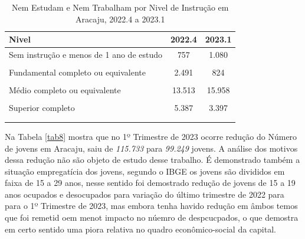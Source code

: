 \documentclass[
  12pt,
  a4paper,
]{article}
\begin{document}
\begingroup\fontsize{9}{11}\selectfont

\begin{longtable}[t]{>{\raggedright\arraybackslash}p{7cm}cc}
\caption{\label{tab:tab7}\label{tab7}Nem Estudam e Nem Trabalham por Nivel de Instrução em Aracaju, 2022.4 a 2023.1}\\
\toprule
Nivel & 2022.4 & 2023.1\\
\midrule
Sem instrução e menos de 1 ano de estudo & 757 & 1.080\\
\cellcolor[HTML]{DCDCDC}{Fundamental incompleto ou equivalente} & \cellcolor[HTML]{DCDCDC}{5.301} & \cellcolor[HTML]{DCDCDC}{8.316}\\
Fundamental completo ou equivalente & 2.491 & 824\\
\cellcolor[HTML]{DCDCDC}{Médio incompleto ou equivalente} & \cellcolor[HTML]{DCDCDC}{4.625} & \cellcolor[HTML]{DCDCDC}{2.937}\\
Médio completo ou equivalente & 13.513 & 15.958\\
\addlinespace
\cellcolor[HTML]{DCDCDC}{Superior incompleto ou equivalente} & \cellcolor[HTML]{DCDCDC}{1.827} & \cellcolor[HTML]{DCDCDC}{1.794}\\
Superior completo & 5.387 & 3.397\\
\bottomrule
\multicolumn{3}{l}{\rule{0pt}{1em}\textit{Fonte: IBGE (2023).}}\\
\multicolumn{3}{l}{\rule{0pt}{1em}}\\
\end{longtable}
\endgroup{}

Na Tabela \ref{tab8} mostra que no 1º Trimestre de 2023 ocorre redução
do Número de jovens em Aracaju, saiu de \emph{115.733} para
\emph{99.249} jovens. A análise dos motivos dessa redução não são objeto
de estudo desse trabalho. É demonstrado também a situação empregatícia
dos jovens, segundo o IBGE \citeyearpar{ibge2023} os jovens são
divididos em faixa de 15 a 29 anos, nesse sentido foi demostrado redução
de jovens de 15 a 19 anos ocupados e desocupados para variação do último
trimestre de 2022 para para o 1º Trimestre de 2023, mas embora tenha
havido redução em âmbos temos que foi remetid oem menot impacto no
núemro de despcucpados, o que demostra em certo sentido uma piora
relativa no quadro econômico-social da capital.

\begingroup\fontsize{9}{11}\selectfont
\end{document}
